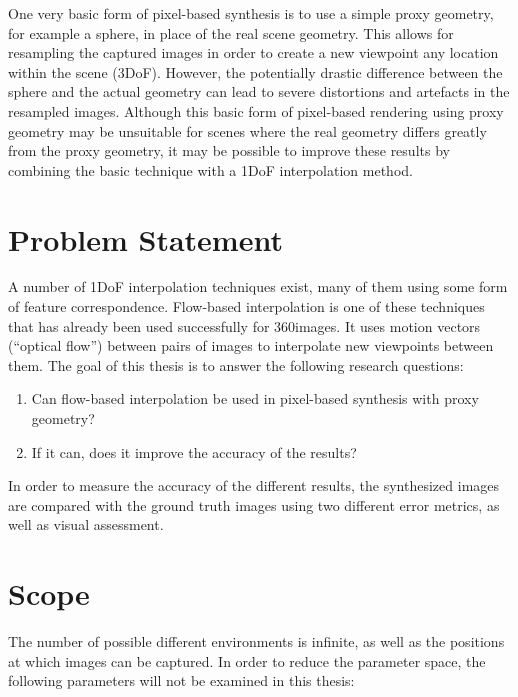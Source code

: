 One very basic form of pixel-based synthesis is to use a simple proxy geometry, for example a sphere, in place of the real scene geometry. This allows for resampling the captured images in order to create a new viewpoint any location within the scene (3DoF). However, the potentially drastic difference between the sphere and the actual geometry can lead to severe distortions and artefacts in the resampled images. Although this basic form of pixel-based rendering using proxy geometry may be unsuitable for scenes where the real geometry differs greatly from the proxy geometry, it may be possible to improve these results by combining the basic technique with a 1DoF interpolation method.

\section*{Problem Statement}
A number of 1DoF interpolation techniques exist, many of them using some form of feature correspondence. Flow-based interpolation is one of these techniques that has already been used successfully for 360\degree images. It uses motion vectors (``optical flow'') between pairs of images to interpolate new viewpoints between them. The goal of this thesis is to answer the following research questions:

\begin{enumerate}
  \item Can flow-based interpolation be used in pixel-based synthesis with proxy geometry?
  \item If it can, does it improve the accuracy of the results?
\end{enumerate}

In order to measure the accuracy of the different results, the synthesized images are compared with the ground truth images using two different error metrics, as well as visual assessment.


\section*{Scope}
The number of possible different environments is infinite, as well as the positions at which images can be captured. In order to reduce the parameter space, the following parameters will not be examined in this thesis:


